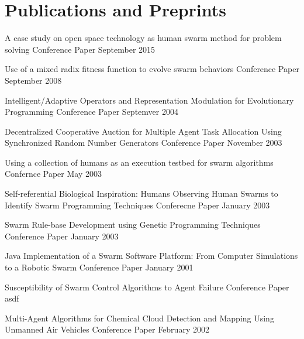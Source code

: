 \documentclass{cv_style}
\begin{document}

	\section{Publications and Preprints}
		\begin{etaremune}			
			\item \paper
				{A case study on open space technology as human swarm method for problem solving}
				{Conference Paper}
				{September 2015}

			\item \paper
				{Use of a mixed radix fitness function to evolve swarm behaviors}
				{Conference Paper}
				{September 2008}

			\item \paper
				{Intelligent/Adaptive Operators and Representation Modulation for Evolutionary Programming}
				{Conference Paper}
				{Septemver 2004}
			
			\item \paper
				{Decentralized Cooperative Auction for Multiple Agent Task Allocation Using Synchronized Random Number Generators}
				{Conference Paper}
				{November 2003}

			\item \paper
				{Using a collection of humans as an execution testbed for swarm algorithms}
				{Confernce Paper}
				{May 2003}

			\item \paper
				{Self-referential Biological Inspiration: Humans Observing Human Swarms to Identify Swarm Programming Techniques}
				{Conferecne Paper}
				{January 2003}

			\item \paper
				{Swarm Rule-base Development using Genetic Programming Techniques}
				{Conference Paper}
				{January 2003}

			\item \paper
				{Java Implementation of a Swarm Software Platform: From Computer Simulations to a Robotic Swarm}
				{Conference Paper}
				{January 2001}

			\item \paper
				{Susceptibility of Swarm Control Algorithms to Agent Failure}
				{Conference Paper}
				{asdf}

			\item \paper
				{Multi-Agent Algorithms for Chemical Cloud Detection and Mapping Using Unmanned Air Vehicles}
				{Conference Paper}
				{February 2002}
			
		\end{etaremune}
		
\end{document}
